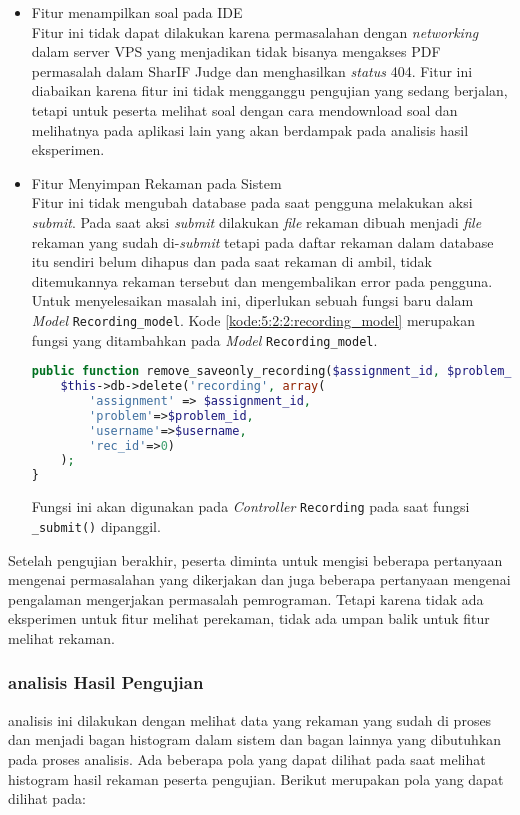 \begin{itemize}
    \item Fitur menampilkan soal pada IDE \\
    Fitur ini tidak dapat dilakukan karena permasalahan dengan \textit{networking} dalam server VPS yang menjadikan tidak bisanya mengakses PDF permasalah dalam SharIF Judge dan menghasilkan \textit{status} 404. Fitur ini diabaikan karena fitur ini tidak mengganggu pengujian yang sedang berjalan, tetapi untuk peserta melihat soal dengan cara mendownload soal dan melihatnya pada aplikasi lain yang akan berdampak pada analisis hasil eksperimen.
    \item Fitur Menyimpan Rekaman pada Sistem \\
    Fitur ini tidak mengubah database pada saat pengguna melakukan aksi \textit{submit}. Pada saat aksi \textit{submit} dilakukan \textit{file} rekaman dibuah menjadi \textit{file} rekaman yang sudah di-\textit{submit} tetapi pada daftar rekaman dalam database itu sendiri belum dihapus dan pada saat rekaman di ambil, tidak ditemukannya rekaman tersebut dan mengembalikan error pada pengguna. Untuk menyelesaikan masalah ini, diperlukan sebuah fungsi baru dalam \textit{Model} \verb|Recording_model|. Kode \ref{kode:5:2:2:recording_model} merupakan fungsi yang ditambahkan pada \textit{Model} \verb|Recording_model|. 

    \begin{lstlisting}[language=php, caption={Fungsi tambahan pada \textit{Recording model}}, label=kode:5:2:2:recording_model]
public function remove_saveonly_recording($assignment_id, $problem_id, $username) {
    $this->db->delete('recording', array(
        'assignment' => $assignment_id, 
        'problem'=>$problem_id, 
        'username'=>$username, 
        'rec_id'=>0)
    );
}
    \end{lstlisting}

    Fungsi ini akan digunakan pada \textit{Controller} \verb|Recording| pada saat fungsi \verb|_submit()| dipanggil.

\end{itemize}

Setelah pengujian berakhir, peserta diminta untuk mengisi beberapa pertanyaan mengenai permasalahan yang dikerjakan dan juga beberapa pertanyaan mengenai pengalaman mengerjakan permasalah pemrograman. Tetapi karena tidak ada eksperimen untuk fitur melihat perekaman, tidak ada umpan balik untuk fitur melihat rekaman. 

\subsubsection{analisis Hasil Pengujian}
analisis ini dilakukan dengan melihat data yang rekaman yang sudah di proses dan menjadi bagan histogram dalam sistem dan bagan lainnya yang dibutuhkan pada proses analisis. Ada beberapa pola yang dapat dilihat pada saat melihat histogram hasil rekaman peserta pengujian. Berikut merupakan pola yang dapat dilihat pada:


